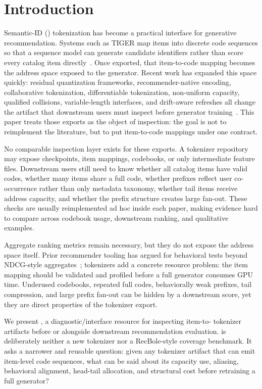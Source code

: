\section{Introduction}

Semantic-ID (\sid) tokenization has become a practical interface for
generative recommendation. Systems such as TIGER map items into discrete code
sequences so that a sequence model can generate candidate identifiers rather
than score every catalog item directly~\cite{rajput2023tiger}. Once exported,
that item-to-code mapping becomes the address space exposed to the generator.
Recent work has expanded this space quickly: residual quantization frameworks,
recommender-native encoding, collaborative tokenization, differentiable
tokenization, non-uniform capacity, qualified collisions, variable-length
interfaces, and drift-aware refreshes all change the artifact that downstream
users must inspect before generator training~\cite{ju2025grid,liang2026resid,zhu2024cost,fu2026diger,wei2026card,hu2026quasid,cheng2026capsid,feng2026dact}.
This paper treats those exports as the object of inspection: the goal is not to
reimplement the literature, but to put item-to-code mappings under one
contract.

No comparable inspection layer exists for these exports. A tokenizer
repository may expose checkpoints, item mappings, codebooks, or only
intermediate feature files. Downstream users still need to know whether all
catalog items have valid codes, whether many items share a full code, whether
prefixes reflect user co-occurrence rather than only metadata taxonomy, whether
tail items receive address capacity, and whether the prefix structure creates
large fan-out. These checks are usually reimplemented ad hoc inside each paper,
making evidence hard to compare across codebook usage, downstream ranking, and
qualitative examples.

Aggregate ranking metrics remain necessary, but they do not expose the address
space itself. Prior recommender tooling has argued for behavioral tests beyond
NDCG-style aggregates~\cite{chia2022reclist}; \sid tokenizers add a concrete
resource problem: the item mapping should be validated and profiled before a
full generator consumes GPU time. Underused codebooks, repeated full codes,
behaviorally weak prefixes, tail compression, and large prefix fan-out can be
hidden by a downstream score, yet they are direct properties of the tokenizer
export.

We present \tool, a diagnostic/interface resource for inspecting item-to-\sid{}
tokenizer artifacts before or alongside downstream recommendation evaluation.
\tool is deliberately neither a new tokenizer nor a RecBole-style coverage
benchmark. It asks a narrower and reusable question: given any tokenizer
artifact that can emit item-level code sequences, what can be said about its
capacity use, aliasing, behavioral alignment, head-tail allocation, and
structural cost before retraining a full generator?

